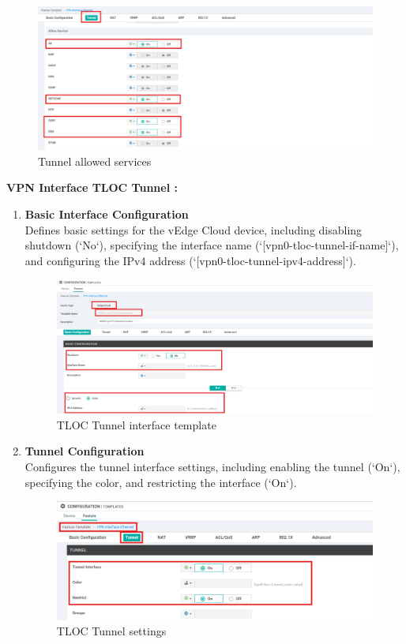 \documentclass[12pt,english]{report}
\begin{document}
\begin{enumerate}
\begin{figure}[H]
    \centering
    \includegraphics[width= 1 \textwidth]{chapitre 3/template/5.5.png}
    \caption{Tunnel allowed services}
    \label{Tunnel allowed services}
\end{figure}
\end{enumerate}
    \textbf{VPN Interface TLOC Tunnel :}
\begin{enumerate}
    \item \textbf{Basic Interface Configuration} \\
    Defines basic settings for the vEdge Cloud device, including disabling shutdown (`No`), specifying the interface name (`[vpn0-tloc-tunnel-if-name]`), and configuring the IPv4 address (`[vpn0-tloc-tunnel-ipv4-address]`).
\begin{figure}[H]
    \centering
    \includegraphics[width= 1 \textwidth]{chapitre 3/template/6.png}
    \caption{TLOC Tunnel interface template}
    \label{TLOC Tunnel interface template}
\end{figure}
    \item \textbf{Tunnel Configuration} \\
    Configures the tunnel interface settings, including enabling the tunnel (`On`), specifying the color, and restricting the interface (`On`).
\begin{figure}[H]
    \centering
    \includegraphics[width= 1 \textwidth]{chapitre 3/template/6.5.png}
    \caption{TLOC Tunnel settings}
    \label{TLOC Tunnel settings}
\end{figure}
\end{enumerate}
\end{document}
